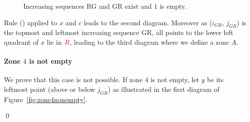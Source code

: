 \documentclass[11pt]{article}
\newenvironment{pf}{{\em \noindent Proof:}}{ \hfill \qed\smallskip}
\newcommand{\R}{\ensuremath{\color{red}R}\xspace}
\newcommand{\rmnum}[1]{\romannumeral #1}
\begin{document}
\begin{pf}
\begin{figure}[H]
\begin{center}
\caption{Increasing sequences RG and GR exist and $1$ is empty.\label{fig:RGGR1empty}}
\end{center}
\end{figure}

Rule (\rmnum{7}) applied to $x$ and $c$ leads to the second diagram.
Moreover as ($i_{GR}$, $j_{GR}$) is the topmost and leftmost increasing sequence GR, all points to the lower left quadrant of $x$ lie in \R,
leading to the third diagram where we define a zone $A$.


\paragraph{Zone $4$ is not empty}

We prove that this case is not possible.
If zone $4$ is not empty, let $y$ be its leftmost point (above or below $j_{GR}$) as illustrated in the first diagram of Figure~\ref{fig:zone4nonempty}. 


\end{pf}
\end{document}
